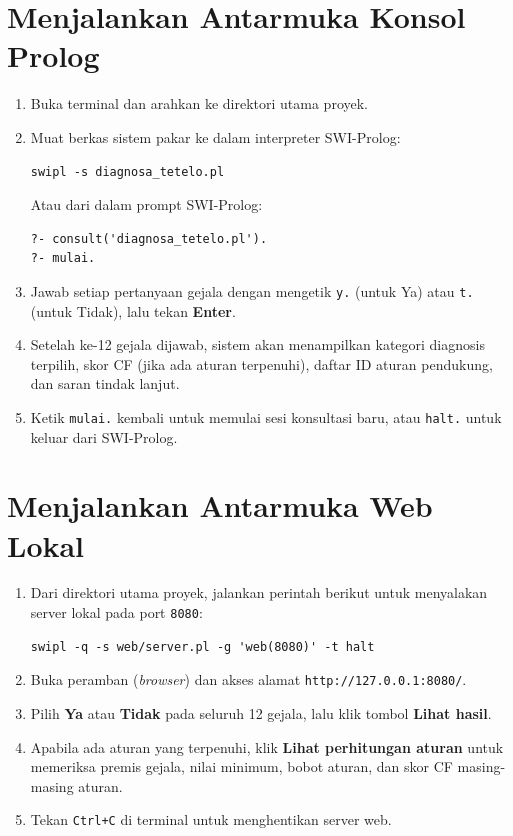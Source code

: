 \documentclass[12pt,a4paper]{report}
\begin{document}
\section{Menjalankan Antarmuka Konsol Prolog}
\begin{enumerate}
  \item Buka terminal dan arahkan ke direktori utama proyek.
  \item Muat berkas sistem pakar ke dalam interpreter SWI-Prolog:
\begin{consolebox}
\begin{verbatim}
swipl -s diagnosa_tetelo.pl
\end{verbatim}
\end{consolebox}
  Atau dari dalam prompt SWI-Prolog:
\begin{consolebox}
\begin{verbatim}
?- consult('diagnosa_tetelo.pl').
?- mulai.
\end{verbatim}
\end{consolebox}
  \item Jawab setiap pertanyaan gejala dengan mengetik \texttt{y.} (untuk Ya) atau \texttt{t.} (untuk Tidak), lalu tekan \textbf{Enter}.
  \item Setelah ke-12 gejala dijawab, sistem akan menampilkan kategori diagnosis terpilih, skor CF (jika ada aturan terpenuhi), daftar ID aturan pendukung, dan saran tindak lanjut.
  \item Ketik \texttt{mulai.} kembali untuk memulai sesi konsultasi baru, atau \texttt{halt.} untuk keluar dari SWI-Prolog.
\end{enumerate}

\section{Menjalankan Antarmuka Web Lokal}
\begin{enumerate}
  \item Dari direktori utama proyek, jalankan perintah berikut untuk menyalakan server lokal pada port \texttt{8080}:
\begin{consolebox}
\begin{verbatim}
swipl -q -s web/server.pl -g 'web(8080)' -t halt
\end{verbatim}
\end{consolebox}
  \item Buka peramban (\textit{browser}) dan akses alamat \texttt{http://127.0.0.1:8080/}.
  \item Pilih \textbf{Ya} atau \textbf{Tidak} pada seluruh 12 gejala, lalu klik tombol \textbf{Lihat hasil}.
  \item Apabila ada aturan yang terpenuhi, klik \textbf{Lihat perhitungan aturan} untuk memeriksa premis gejala, nilai minimum, bobot aturan, dan skor CF masing-masing aturan.
  \item Tekan \texttt{Ctrl+C} di terminal untuk menghentikan server web.
\end{enumerate}
\end{document}
